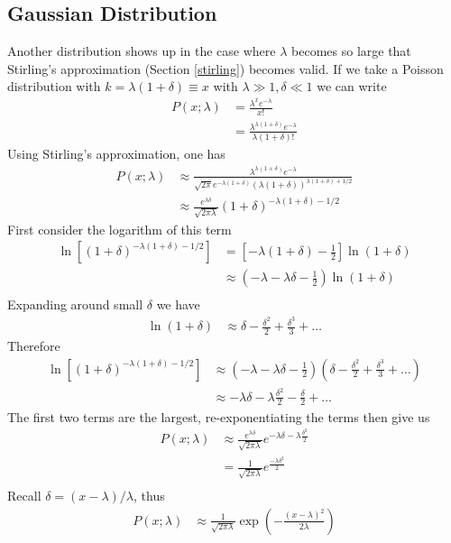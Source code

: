 \subsection{Gaussian Distribution}
Another distribution shows up in the case where $\lambda$ becomes so large that Stirling's approximation (Section \ref{stirling}) becomes valid. If we take a Poisson distribution with  $k = \lambda(1+\delta) \equiv x$ with $\lambda \gg 1, \delta \ll 1$ we can write
\begin{align}
	P(x; \lambda) &= \frac{\lambda^xe^{-\lambda}}{x!}\\
	&= \frac{\lambda^{\lambda(1+\delta)}e^{-\lambda}}{\lambda(1+\delta)!}
\end{align}
Using Stirling's approximation, one has
\begin{align}
		P(x; \lambda) &\approx \frac{\lambda^{\lambda(1+\delta)}e^{-\lambda}}{\sqrt{2\pi}e^{-\lambda(1+\delta)}(\lambda(1+\delta))^{\lambda(1+\delta)+1/2}}\\
		&\approx \frac{e^{\lambda\delta}}{\sqrt{2\pi\lambda}} (1+\delta)^{-\lambda(1+\delta)-1/2}
\end{align}
First consider the logarithm of this term
\begin{align}
	\ln\left[(1+\delta)^{-\lambda(1+\delta)-1/2}\right] &= \left[-\lambda(1+\delta)-\frac{1}{2}\right]\ln(1+\delta) \\
	&\approx \left(- \lambda - \lambda\delta - \frac{1}{2}\right)\ln(1+\delta) \\
\end{align}
Expanding around small $\delta$ we have
\begin{align}
	\ln(1+\delta) &\approx \delta - \frac{\delta^2}{2} + \frac{\delta^3}{3} + \dots
\end{align}
Therefore
\begin{align}
	\ln\left[(1+\delta)^{-\lambda(1+\delta)-1/2}\right] &\approx \left(-\lambda - \lambda\delta - \frac{1}{2}\right)\left(\delta - \frac{\delta^2}{2} + \frac{\delta^3}{3} + \dots\right) \\
	&\approx -\lambda\delta - \lambda\frac{\delta^2}{2} - \frac{\delta}{2} + \dots
\end{align}
The first two terms are the largest, re-exponentiating the terms then give us
\begin{align}
	P(x; \lambda) &\approx \frac{e^{\lambda\delta}}{\sqrt{2\pi\lambda}}  e^{-\lambda\delta - \lambda\frac{\delta^2}{2}}\\
	&= \frac{1}{\sqrt{2\pi\lambda}}e^{\frac{-\lambda\delta^2}{2}}  \\
\end{align}
Recall $\delta = (x-\lambda)/\lambda$, thus
\begin{align}
	P(x;\lambda) &\approx \frac{1}{\sqrt{2\pi\lambda}}\exp\left(-\frac{(x-\lambda)^2}{2\lambda}\right)
\end{align}

